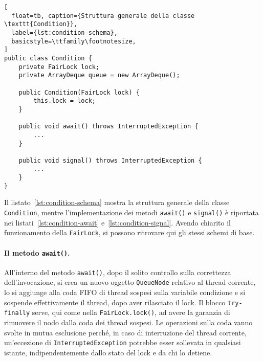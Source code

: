 \documentclass[a4paper,twoside]{article}
\newcommand\code{\lstinline[basicstyle=\normalsize\ttfamily]}
\begin{document}
\begin{lstlisting}[
  float=tb, caption={Struttura generale della classe \texttt{Condition}},
  label={lst:condition-schema},
  basicstyle=\ttfamily\footnotesize,
]
public class Condition {
	private FairLock lock;
	private ArrayDeque queue = new ArrayDeque();

	public Condition(FairLock lock) {
		this.lock = lock;
	}

	public void await() throws InterruptedException {
		...
	}

	public void signal() throws InterruptedException {
		...
	}
}
\end{lstlisting}





Il listato~\ref{lst:condition-schema} mostra la struttura generale della classe \code|Condition|, mentre l'implementazione dei metodi \code|await()| e \code|signal()| è riportata nei listati~\ref{lst:condition-await} e~\ref{lst:condition-signal}. Avendo chiarito il funzionamento della \code|FairLock|, si possono ritrovare qui gli stessi schemi di base.

\paragraph{Il metodo \texttt{await()}.}
All'interno del metodo \code|await()|, dopo il solito controllo sulla correttezza dell'invocazione, si crea un nuovo oggetto \code|QueueNode| relativo al thread corrente, lo si aggiunge alla coda FIFO di thread sospesi sulla variabile condizione e si sospende effettivamente il thread, dopo aver rilasciato il lock. Il blocco \code|try-finally| serve, qui come nella \code|FairLock.lock()|, ad avere la garanzia di rimuovere il nodo dalla coda dei thread sospesi. Le operazioni sulla coda vanno svolte in mutua esclusione perché, in caso di interruzione del thread corrente, un'eccezione di \code|InterruptedException| potrebbe esser sollevata in qualsiasi istante, indipendentemente dallo stato del lock e da chi lo detiene.
\end{document}
